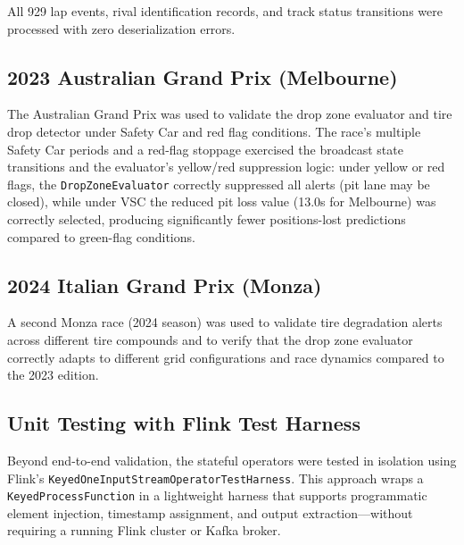 \documentclass[a4paper,twocolumn]{article}
\begin{document}
All 929 lap events, rival identification records, and track status
transitions were processed with zero deserialization errors.

\subsection{2023 Australian Grand Prix (Melbourne)}

The Australian Grand Prix was used to validate the drop zone evaluator
and tire drop detector under Safety Car and red flag conditions. The
race's multiple Safety Car periods and a red-flag stoppage exercised
the broadcast state transitions and the evaluator's yellow/red
suppression logic: under yellow or red flags, the
\texttt{DropZoneEvaluator} correctly suppressed all alerts (pit lane
may be closed), while under VSC the reduced pit loss value (13.0s
for Melbourne) was correctly selected, producing significantly fewer
positions-lost predictions compared to green-flag conditions.

\subsection{2024 Italian Grand Prix (Monza)}

A second Monza race (2024 season) was used to validate tire degradation
alerts across different tire compounds and to verify that the drop zone
evaluator correctly adapts to different grid configurations and race
dynamics compared to the 2023 edition.

\subsection{Unit Testing with Flink Test Harness}

Beyond end-to-end validation, the stateful operators were tested in
isolation using Flink's \texttt{KeyedOneInputStreamOperatorTestHarness}.
This approach wraps a \texttt{KeyedProcessFunction} in a lightweight
harness that supports programmatic element injection, timestamp
assignment, and output extraction---without requiring a running Flink
cluster or Kafka broker.
\end{document}
